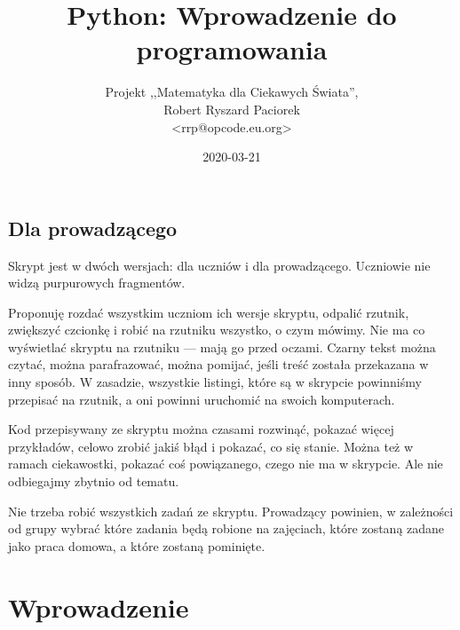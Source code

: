 \documentclass{pdfBooklets}
\title{Python: Wprowadzenie do programowania}
\author{%
	Projekt ,,Matematyka dla Ciekawych Świata'',\\
	Robert Ryszard Paciorek\\\normalsize\ttfamily <rrp@opcode.eu.org>
}
\date  {2020-03-21}
\begin{document}
\maketitle

\begin{teacherOnly}
\section*{Dla prowadzącego}
Skrypt jest w dwóch wersjach: dla uczniów i dla prowadzącego.
Uczniowie nie widzą purpurowych fragmentów.

Proponuję rozdać wszystkim uczniom ich wersje skryptu, odpalić rzutnik, zwiększyć czcionkę i robić
na rzutniku wszystko, o czym mówimy. Nie ma co wyświetlać skryptu na rzutniku --- mają go przed oczami.
Czarny tekst można czytać, można parafrazować, można pomijać, jeśli treść została przekazana w inny sposób.
W zasadzie, wszystkie listingi, które są w skrypcie powinniśmy przepisać na rzutnik, a oni powinni
uruchomić na swoich komputerach.

Kod przepisywany ze skryptu można czasami rozwinąć, pokazać więcej przykładów, celowo zrobić jakiś błąd i pokazać, co się stanie.
Można też w ramach ciekawostki, pokazać coś powiązanego, czego nie ma w skrypcie.
Ale nie odbiegajmy zbytnio od tematu.

Nie trzeba robić wszystkich zadań ze skryptu. Prowadzący powinien, w zależności od grupy wybrać które zadania będą robione na zajęciach,
które zostaną zadane jako praca domowa, a które zostaną pominięte.
\end{teacherOnly}

\section{Wprowadzenie}
\end{document}

